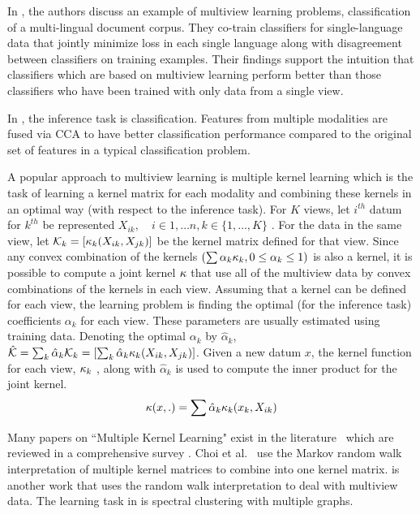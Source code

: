 \documentclass[12pt,oneside,final]{thesis}\usepackage[]{graphicx}\usepackage[]{color}
\begin{document}
In  \cite{Amini2009}, the authors  discuss  an example of multiview learning problems, classification of a multi-lingual document corpus. They  co-train  classifiers for single-language data that jointly minimize  loss in each single language along with disagreement between classifiers on training examples. Their findings support the intuition that  classifiers which are based on multiview learning perform   better than those classifiers who have been trained with only data from a single view.

In \cite{Sun2005}, the inference task is classification. Features from multiple modalities are fused via CCA to have better classification performance compared to the original set of features in a typical classification problem.

A popular approach to multiview learning is multiple kernel learning which is the task of learning a  kernel matrix for each modality and combining these kernels in an optimal way (with respect to the inference task). For $K$ views, let $i^{th}$ datum for $k^{th}$ be represented $X_{ik},\quad i \in {1,\ldots n}, k \in \{ 1,\ldots, K \}$ . For the data in the same view, let ${\mathcal{K}}_{k} = \left[ \kappa_{k} (X_{ik},X_{jk}) \right] $ be the kernel matrix defined for that view.  Since any convex combination of the kernels $(\sum{\alpha_k \kappa_{k} } , 0 \leq \alpha_k \leq 1)$ is also a kernel, it is possible to compute a joint kernel $\kappa$ that use all of the multiview data by convex  combinations of the kernels in each view. Assuming that a kernel can be defined for each view, the learning problem is  finding the optimal (for the inference task) coefficients $\alpha_k$ for each view. These parameters are usually estimated using training data. Denoting the optimal  $\alpha_k$ by  $\hat{\alpha}_k$,  $\hat{\mathcal{K}} = \sum_k{\hat{\alpha}_k \mathcal{K}_{k} }  =  \left[ \sum_k{\hat{\alpha}_k {\kappa_k} (X_{ik},X_{jk})} \right] $.  Given a new datum $x$, the kernel function for each view, $\kappa_{k}$ ,  along with $\hat{\alpha}_k$ is used to compute the inner product for the joint kernel. 
\[
{\kappa}(x,.)= \sum{\hat{\alpha}_k {\kappa_k} (x_{k},X_{ik})} 
\]

Many papers on ``Multiple Kernel Learning"   exist in the literature~\cite{McFee:2011:LMS:1953048.1953063,Lin2009,Lanckriet2004} which are reviewed in a comprehensive survey \cite{MKLSurvey}.
Choi et al.\ \cite{Choi:2008:MIM:1619995.1620064} use the Markov random walk interpretation of multiple kernel matrices to combine into one kernel matrix. \cite{ZhouBurges2007a} is another work that uses the random walk interpretation to deal with multiview data. The learning task in  \cite{ZhouBurges2007a} is spectral clustering with multiple graphs.
\end{document}
